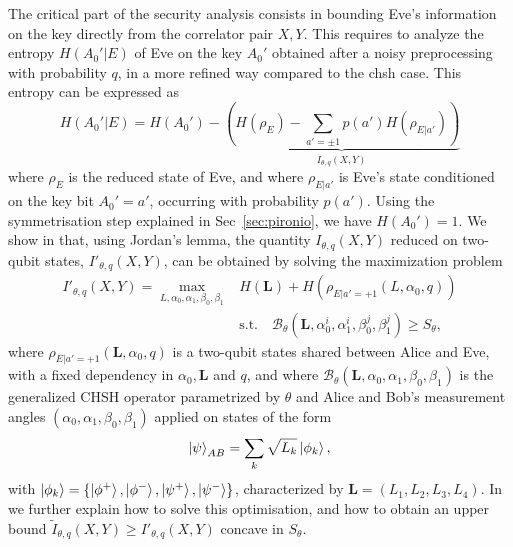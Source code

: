 The critical part of the security analysis consists in bounding Eve's information on the key directly from the correlator pair $X,Y$.
This requires to analyze the entropy $H(A_0'|E)$ of Eve on the key $A_0'$ obtained after a noisy preprocessing with probability $q$, in a more refined way compared to the \acrshort{chsh} case.
This entropy can be expressed as 
\begin{equation}
	H(A_0'|E) = H(A_0') - \underbrace{\left(H(\rho_E) - \sum_{a'=\pm1}p(a')H(\rho_{E|a'})\right)}_{I_{\theta,q}(X,Y)}
\end{equation}
where $\rho_E$ is the reduced state of Eve, and where $\rho_{E|a'}$ is Eve's state conditioned on the key bit $A_0'=a'$, occurring with probability $p(a')$.
Using the symmetrisation step explained in Sec~\ref{sec:pironio}, we have $H(A_0')=1$.
We show in \cite{Sekatski2021} that, using Jordan's lemma, the quantity $I_{\theta,q}(X,Y)$ reduced on two-qubit states, $I'_{\theta,q}(X,Y)$, can be obtained by solving the maximization problem
\begin{equation}
	\begin{split}
		I'_{\theta,q}(X,Y) = \max_{L,\alpha_0,\alpha_1,\beta_0,\beta_1} & H(\mathbf{L}) + H(\rho_{E|a'=+1}(L,\alpha_0,q)) \\
		&\mathrm{s.t.}\quad 
		\mathcal{B}_\theta (\mathbf{L},\alpha_0^i,\alpha_1^i,\beta_0^j,\beta_1^j) \geq S_\theta,
	\end{split}
\end{equation}
where $\rho_{E|a'=+1}(\mathbf{L},\alpha_0,q)$ is a two-qubit states shared between Alice and Eve, with a fixed dependency in $\alpha_0,\mathbf{L}$ and $q$, and where $\mathcal{B}_\theta (\mathbf{L},\alpha_0,\alpha_1,\beta_0,\beta_1)$ is the generalized CHSH operator parametrized by $\theta$ and Alice and Bob's measurement angles $(\alpha_0,\alpha_1,\beta_0,\beta_1)$ applied on states of the form
\begin{equation}
	\ket{\psi}_{AB} = \sum_k \sqrt{L_k} \ket{\phi_k},
	\label{eq:}
\end{equation}
with $\ket{\phi_k}=\{\ket{\phi^+},\ket{\phi^-},\ket{\psi^+},\ket{\psi^-}\}$, characterized by $\mathbf{L}=(L_1,L_2,L_3,L_4)$.
In \cite{Sekatski2021} we further explain how to solve this optimisation, and how to obtain an upper bound $\tilde{I}_{\theta,q}(X,Y)\geq I'_{\theta,q}(X,Y)$ concave in $S_\theta$.

